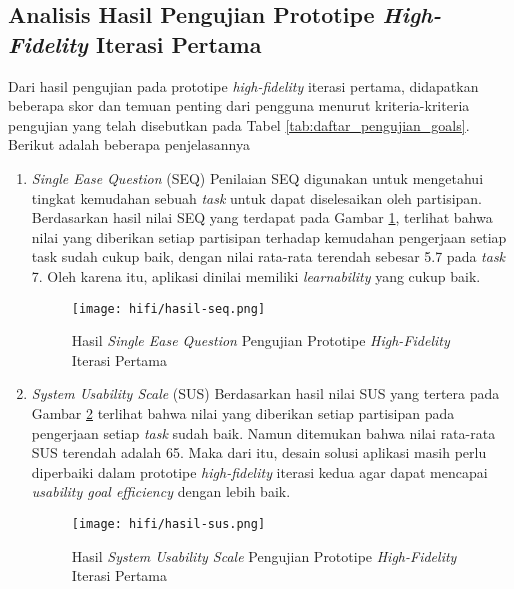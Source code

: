 \newpage

\subsection{Analisis Hasil Pengujian Prototipe \textit{High-Fidelity} Iterasi Pertama}
\label{subsec:analisis_hasil_1}

Dari hasil pengujian pada prototipe \textit{high-fidelity} iterasi pertama, didapatkan beberapa skor dan temuan penting dari pengguna menurut kriteria-kriteria pengujian yang telah disebutkan pada Tabel \ref{tab:daftar_pengujian_goals}. Berikut adalah beberapa penjelasannya

\begin{enumerate}
  \item \textit{Single Ease Question} (SEQ)
  \subitem  Penilaian SEQ digunakan untuk mengetahui tingkat kemudahan sebuah \textit{task} untuk dapat diselesaikan oleh partisipan. Berdasarkan hasil nilai SEQ yang terdapat pada Gambar \ref{img:seq_1}, terlihat bahwa nilai yang diberikan setiap partisipan terhadap kemudahan pengerjaan setiap task sudah cukup baik, dengan nilai rata-rata terendah sebesar 5.7 pada \textit{task} 7. Oleh karena itu, aplikasi dinilai memiliki \textit{learnability} yang cukup baik. 

  \begin{figure}[h]
    \centering
    \texttt{[image: hifi/hasil-seq.png]}
    \caption{Hasil \textit{Single Ease Question} Pengujian Prototipe \textit{High-Fidelity} Iterasi Pertama}
    \label{img:seq_1}
  \end{figure}
  \FloatBarrier

  \item \textit{System Usability Scale} (SUS)
  \subitem  Berdasarkan hasil nilai SUS yang tertera pada Gambar \ref{img:sus_1} terlihat bahwa nilai yang diberikan setiap partisipan pada pengerjaan setiap \textit{task} sudah baik. Namun ditemukan bahwa nilai rata-rata SUS terendah adalah 65. Maka dari itu, desain solusi aplikasi masih perlu diperbaiki dalam prototipe \textit{high-fidelity} iterasi kedua agar dapat mencapai \textit{usability goal efficiency} dengan lebih baik. 

  \begin{figure}[h]
    \centering
    \texttt{[image: hifi/hasil-sus.png]}
    \caption{Hasil \textit{System Usability Scale} Pengujian Prototipe \textit{High-Fidelity} Iterasi Pertama}
    \label{img:sus_1}
  \end{figure}
  \FloatBarrier


\end{enumerate}
